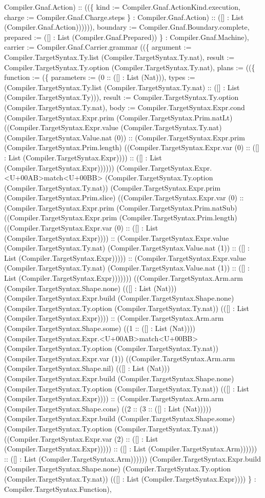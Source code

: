 \documentclass[11pt]{article}
\begin{document}
Compiler.Gnaf.Action) :: ((\{ kind := Compiler.Gnaf.ActionKind.execution, charge := Compiler.Gnaf.Charge.steps \} : Compiler.Gnaf.Action) :: ([] : List (Compiler.Gnaf.Action)))))), boundary := Compiler.Gnaf.Boundary.complete, prepared := ([] : List (Compiler.Gnaf.Prepared)) \} : Compiler.Gnaf.Machine), carrier := Compiler.Gnaf.Carrier.grammar ((\{ argument := Compiler.TargetSyntax.Ty.list (Compiler.TargetSyntax.Ty.nat), result := Compiler.TargetSyntax.Ty.option (Compiler.TargetSyntax.Ty.nat), plans := ((\{ function := (\{ parameters := (0 :: ([] : List (Nat))), types := (Compiler.TargetSyntax.Ty.list (Compiler.TargetSyntax.Ty.nat) :: ([] : List (Compiler.TargetSyntax.Ty))), result := Compiler.TargetSyntax.Ty.option (Compiler.TargetSyntax.Ty.nat), body := Compiler.TargetSyntax.Expr.cond (Compiler.TargetSyntax.Expr.prim (Compiler.TargetSyntax.Prim.natLt) ((Compiler.TargetSyntax.Expr.value (Compiler.TargetSyntax.Ty.nat) (Compiler.TargetSyntax.Value.nat (0)) :: (Compiler.TargetSyntax.Expr.prim (Compiler.TargetSyntax.Prim.length) ((Compiler.TargetSyntax.Expr.var (0) :: ([] : List (Compiler.TargetSyntax.Expr)))) :: ([] : List (Compiler.TargetSyntax.Expr)))))) (Compiler.TargetSyntax.Expr.<U+00AB>match<U+00BB> (Compiler.TargetSyntax.Ty.option (Compiler.TargetSyntax.Ty.nat)) (Compiler.TargetSyntax.Expr.prim (Compiler.TargetSyntax.Prim.slice) ((Compiler.TargetSyntax.Expr.var (0) :: (Compiler.TargetSyntax.Expr.prim (Compiler.TargetSyntax.Prim.natSub) ((Compiler.TargetSyntax.Expr.prim (Compiler.TargetSyntax.Prim.length) ((Compiler.TargetSyntax.Expr.var (0) :: ([] : List (Compiler.TargetSyntax.Expr)))) :: (Compiler.TargetSyntax.Expr.value (Compiler.TargetSyntax.Ty.nat) (Compiler.TargetSyntax.Value.nat (1)) :: ([] : List (Compiler.TargetSyntax.Expr))))) :: (Compiler.TargetSyntax.Expr.value (Compiler.TargetSyntax.Ty.nat) (Compiler.TargetSyntax.Value.nat (1)) :: ([] : List (Compiler.TargetSyntax.Expr))))))) ((Compiler.TargetSyntax.Arm.arm (Compiler.TargetSyntax.Shape.none) (([] : List (Nat))) (Compiler.TargetSyntax.Expr.build (Compiler.TargetSyntax.Shape.none) (Compiler.TargetSyntax.Ty.option (Compiler.TargetSyntax.Ty.nat)) (([] : List (Compiler.TargetSyntax.Expr)))) :: (Compiler.TargetSyntax.Arm.arm (Compiler.TargetSyntax.Shape.some) ((1 :: ([] : List (Nat)))) (Compiler.TargetSyntax.Expr.<U+00AB>match<U+00BB> (Compiler.TargetSyntax.Ty.option (Compiler.TargetSyntax.Ty.nat)) (Compiler.TargetSyntax.Expr.var (1)) ((Compiler.TargetSyntax.Arm.arm (Compiler.TargetSyntax.Shape.nil) (([] : List (Nat))) (Compiler.TargetSyntax.Expr.build (Compiler.TargetSyntax.Shape.none) (Compiler.TargetSyntax.Ty.option (Compiler.TargetSyntax.Ty.nat)) (([] : List (Compiler.TargetSyntax.Expr)))) :: (Compiler.TargetSyntax.Arm.arm (Compiler.TargetSyntax.Shape.cons) ((2 :: (3 :: ([] : List (Nat))))) (Compiler.TargetSyntax.Expr.build (Compiler.TargetSyntax.Shape.some) (Compiler.TargetSyntax.Ty.option (Compiler.TargetSyntax.Ty.nat)) ((Compiler.TargetSyntax.Expr.var (2) :: ([] : List (Compiler.TargetSyntax.Expr))))) :: ([] : List (Compiler.TargetSyntax.Arm)))))) :: ([] : List (Compiler.TargetSyntax.Arm)))))) (Compiler.TargetSyntax.Expr.build (Compiler.TargetSyntax.Shape.none) (Compiler.TargetSyntax.Ty.option (Compiler.TargetSyntax.Ty.nat)) (([] : List (Compiler.TargetSyntax.Expr)))) \} : Compiler.TargetSyntax.Function), 
\end{document}
